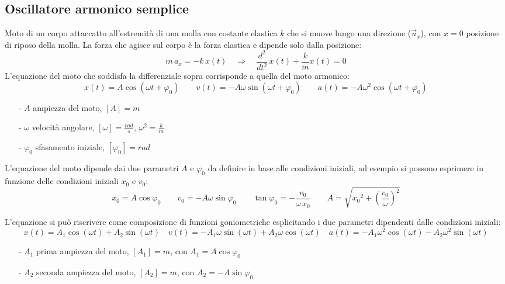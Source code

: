\documentclass[a4paper]{article}
\newcommand\ux{\vec{u}_x}
\newcommand\dts{\frac{d^2}{dt^2}\,}
\begin{document}
\newpage

\subsection{Oscillatore armonico semplice}
Moto di un corpo attaccatto all'estremità di una molla con costante elastica \(k\) che si muove lungo una direzione (\(\ux\)),
con \(x=0\) posizione di riposo della molla. La forza che agisce sul corpo è la forza elastica e dipende solo dalla posizione:
\[m \, a_x = -k \, x(t) \quad \Rightarrow \quad \dts x(t) + \frac{k}{m} x(t) = 0\]
L'equazione del moto che soddisfa la differenziale sopra corrisponde a quella del moto armonico:
\[x(t) = A \cos (\omega t + \varphi_0) \qquad v(t) = -A \omega \sin (\omega t + \varphi_0) \qquad a(t) = -A \omega^2 \cos (\omega t + \varphi_0)\]
\begin{itemize}[topsep=3pt, itemsep=0pt]
	\item[-] \(A\) ampiezza del moto, \(\left[A\right] = m\)
	\item[-] \(\omega\) velocità angolare, \(\left[\omega\right] = \frac{rad}{s}\), \(\omega^2 = \frac{k}{m}\)
	\item[-] \(\varphi_0\) sfasamento iniziale, \(\left[\varphi_0\right] = rad\)
\end{itemize}

L'equazione del moto dipende dai due parametri \(A\) e \(\varphi_0\) da definire in base alle condizioni iniziali, ad esempio
si possono esprimere in funzione delle condizioni iniziali \(x_0\) e \(v_0\):
\[x_0 = A \cos \varphi_0 \qquad v_0 = -A \omega \sin \varphi_0 \qquad \tan \varphi_0 = -\frac{v_0}{\omega \, x_0} \qquad A = \sqrt{{x_0}^2 + \left(\frac{v_0}{\omega}\right)^2}\]

L'equazione si può riscrivere come composizione di funzioni goniometriche esplicitando i due parametri dipendenti dalle condizioni iniziali:
\[x(t) = A_1 \cos (\omega t) + A_2 \sin (\omega t) \quad v(t) = -A_1 \omega \sin (\omega t) + A_2 \omega \cos (\omega t) \quad a(t) = -A_1 \omega^2 \cos (\omega t) - A_2 \omega^2 \sin (\omega t)\]
\begin{itemize}[topsep=3pt, itemsep=0pt]
	\item[-] \(A_1\) prima ampiezza del moto, \(\left[A_1\right] = m\), con \(A_1 = A \cos \varphi_0\)
	\item[-] \(A_2\) seconda ampiezza del moto, \(\left[A_2\right] = m\), con \(A_2 = -A \sin \varphi_0\)
\end{itemize}
\end{document}
